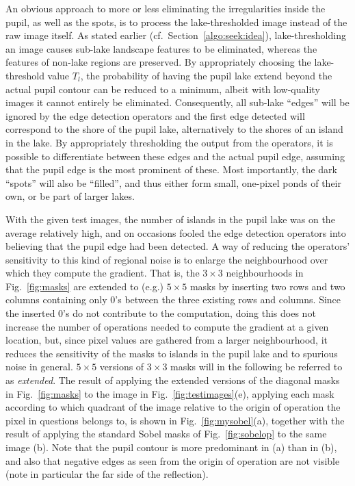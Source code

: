An obvious approach to more or less eliminating the irregularities
inside the pupil, as well as the spots, is to process the
lake-thresholded image instead of the raw image itself.  As stated
earlier (cf.\ Section~\ref{algo:seek:idea}), lake-thresholding an
image causes sub-lake landscape features to be eliminated, whereas the
features of non-lake regions are preserved.  By appropriately choosing
the lake-threshold value $T_{l}$, the probability of having the pupil
lake extend beyond the actual pupil contour can be reduced to a
minimum, albeit with low-quality images it cannot entirely be
eliminated.  Consequently, all sub-lake ``edges'' will be ignored by
the edge detection operators and the first edge detected will
correspond to the shore of the pupil lake, alternatively to the shores
of an island in the lake.  By appropriately thresholding the output
from the operators, it is possible to differentiate between these
edges and the actual pupil edge, assuming that the pupil edge is the
most prominent of these.  Most importantly, the dark ``spots'' will
also be ``filled'', and thus either form small, one-pixel ponds of
their own, or be part of larger lakes.

With the given test images, the number of islands in the pupil lake
was on the average relatively high, and on occasions fooled the edge
detection operators into believing that the pupil edge had been
detected.  A way of reducing the operators' sensitivity to this kind
of regional noise is to enlarge the neighbourhood over which they
compute the gradient.  That is, the $3\times 3$ neighbourhoods in
Fig.~\ref{fig:masks} are extended to (e.g.) $5\times 5$ masks by
inserting two rows and two columns containing only 0's between the
three existing rows and columns.  Since the inserted 0's do not
contribute to the computation, doing this does not increase the number
of operations needed to compute the gradient at a given location, but,
since pixel values are gathered from a larger neighbourhood, it
reduces the sensitivity of the masks to islands in the pupil lake and
to spurious noise in general.  $5\times 5$ versions of $3\times 3$
masks will in the following be referred to as {\em extended\/}.  The
result of applying the extended versions of the diagonal masks in
Fig.~\ref{fig:masks} to the image in Fig.~\ref{fig:testimages}(e),
applying each mask according to which quadrant of the image relative
to the origin of operation the pixel in questions belongs to, is shown
in Fig.~\ref{fig:mysobel}(a), together with the result of applying the
standard Sobel masks of Fig.~\ref{fig:sobelop} to the same image (b).
Note that the pupil contour is more predominant in (a) than in (b),
and also that negative edges as seen from the origin of operation are
not visible (note in particular the far side of the reflection).

